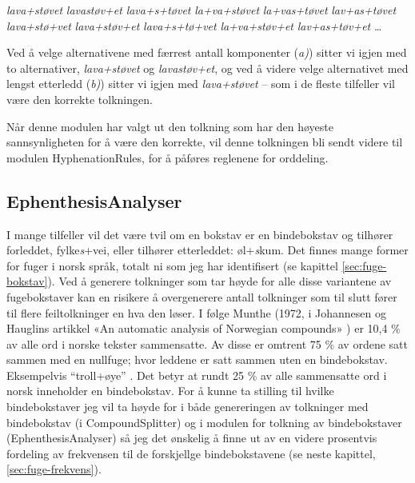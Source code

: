 \textit{lava+støvet}\newline
\textit{lavastøv+et}\newline
\textit{lava+s+tøvet}\newline
\textit{la+va+støvet}\newline
\textit{la+vas+tøvet}\newline
\textit{lav+as+tøvet}\newline
\textit{lava+stø+vet}\newline
\textit{lava+støv+et}\newline
\textit{lava+s+tø+vet}\newline
\textit{la+va+støv+et}\newline
\textit{lav+as+tøv+et}\newline
… 

Ved å velge alternativene med færrest antall komponenter (\textit{a)}) sitter vi igjen med to alternativer, \textit{lava+støvet} og \textit{lavastøv+et}, og ved å videre velge alternativet med lengst etterledd (\textit{b)}) sitter vi igjen med \textit{lava+støvet} -- som i de fleste tilfeller vil være den korrekte tolkningen.

Når denne modulen har valgt ut den tolkning som har den høyeste sannsynligheten for å være den korrekte, vil denne tolkningen bli sendt videre til modulen HyphenationRules, for å påføres reglenene for orddeling.

\subsection{EphenthesisAnalyser}
\label{sec:eph}

I mange tilfeller vil det være tvil om en bokstav er en bindebokstav og tilhører forleddet, fylke\textit{s}+vei, eller tilhører etterleddet: øl+\textit{s}kum. Det finnes mange former for fuger i norsk språk, totalt ni som jeg har identifisert (se kapittel \ref{sec:fuge-bokstav}). Ved å generere tolkninger som tar høyde for alle disse variantene av fugebokstaver kan en risikere å overgenerere antall tolkninger som til slutt fører til flere feiltolkninger en hva den løser. I følge Munthe (1972, i Johannesen og Hauglins artikkel «An automatic analysis of Norwegian compounds» \cite{johannessen1996automatic}) er 10,4 \% av alle ord i norske tekster sammensatte. Av disse er omtrent 75 \% av ordene satt sammen med en nullfuge; hvor leddene er satt sammen uten en bindebokstav. Eksempelvis “troll+øye” \cite{johannessen1996automatic}. Det betyr at rundt 25 \% av alle sammensatte ord i norsk inneholder en bindebokstav. For å kunne ta stilling til hvilke bindebokstaver jeg vil ta høyde for i både genereringen av tolkninger med bindebokstav (i CompoundSplitter) og i modulen for tolkning av bindebokstaver (EphenthesisAnalyser) så jeg det ønskelig å finne ut av en videre prosentvis fordeling av frekvensen til de forskjellge bindebokstavene (se neste kapittel, \ref{sec:fuge-frekvens}). 

